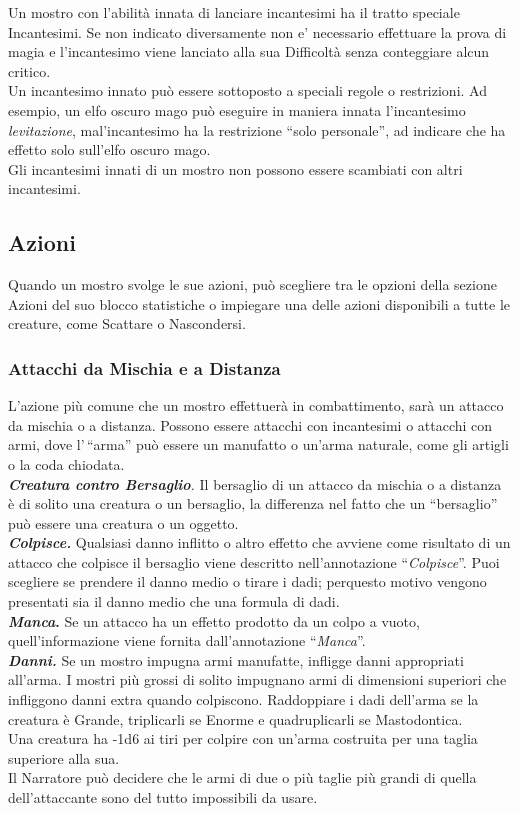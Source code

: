 Un mostro con l'abilità innata di lanciare incantesimi ha il tratto speciale Incantesimi.
Se non indicato diversamente non e' necessario effettuare la prova di magia e l'incantesimo viene lanciato alla sua Difficoltà senza conteggiare alcun critico.\\
Un incantesimo innato può essere sottoposto a speciali regole o restrizioni. Ad esempio, un elfo oscuro mago può eseguire in maniera innata l'incantesimo \emph{levitazione}, mal'incantesimo ha la  restrizione ``solo personale'', ad indicare che ha effetto solo
sull'elfo oscuro mago. \\
Gli incantesimi innati di un mostro non possono essere scambiati con altri incantesimi. 

\subsection{Azioni}

Quando un mostro svolge le sue azioni, può scegliere tra le opzioni della sezione Azioni del suo blocco statistiche o impiegare una delle azioni disponibili a tutte le creature, come Scattare o Nascondersi.

\subsubsection{Attacchi da Mischia e a Distanza}

L'azione più comune che un mostro effettuerà in combattimento, sarà un attacco da mischia o a distanza. Possono essere attacchi con incantesimi o attacchi con armi, dove l'\,``arma'' può essere un manufatto o un'arma naturale, come gli artigli o la coda chiodata.\\
\emph{\textbf{Creatura contro Bersaglio}.} Il bersaglio di un attacco da mischia o a distanza è di solito una creatura o un bersaglio, la differenza nel fatto che un ``bersaglio'' può essere una creatura o un oggetto.\\
\emph{\textbf{Colpisce.}} Qualsiasi danno inflitto o altro effetto che avviene come risultato di un attacco che colpisce il bersaglio viene descritto nell'annotazione ``\emph{Colpisce}''. Puoi scegliere se prendere il danno medio o tirare i dadi; perquesto  motivo vengono presentati sia il danno medio che una formula di dadi. \\
\textbf{\emph{Manca}.} Se un attacco ha un effetto prodotto da un colpo a vuoto, quell'informazione viene fornita dall'annotazione ``\emph{Manca}''.\\
\emph{\textbf{Danni.}} Se un mostro impugna armi manufatte, infligge danni appropriati all'arma. I mostri più grossi di solito impugnano armi di dimensioni superiori che infliggono danni extra quando colpiscono. Raddoppiare i dadi dell'arma se la creatura è Grande, triplicarli se Enorme e quadruplicarli se Mastodontica.\\
Una creatura ha -1d6 ai tiri per colpire con un'arma costruita per una taglia superiore alla sua. \\
Il Narratore può decidere che le armi di due o più taglie più grandi di quella dell'attaccante sono del tutto impossibili da usare.

